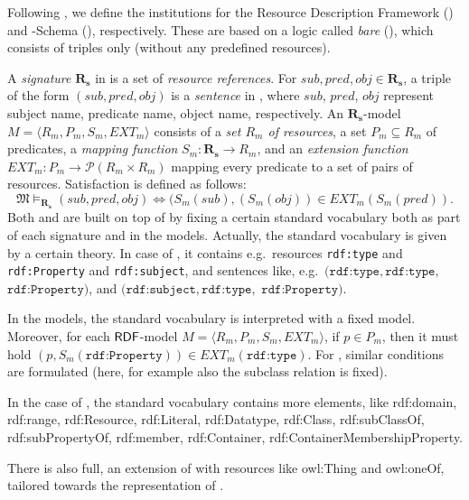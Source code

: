 \documentclass[10pt,%
\ifpretendfinal
final%
\else
draft%
\fi,
]{scrreprt}
\begin{document}
\begin{definition}
Following \cite{Lucanu}, 
we define the institutions for the Resource Description
Framework (\RDF) and \RDF-Schema (\RDFS), respectively. 
These are based on a logic called \emph{bare} \RDF (\SimpleRDF), which consists
of triples only (without any predefined resources).

A \textit{signature} $\mathbf{R_s}$ in \SimpleRDF is a set of
\textit{resource references}. For $sub, pred, obj \in \mathbf{R_s}$, a
triple of the form $(sub, pred, obj)$ is a \textit{sentence} in \SimpleRDF,
where $sub$, $pred$, $obj$ represent subject name, predicate name,
object name, respectively. An $\mathbf{R_s}$-model $M =
\langle R_m, P_m, S_m, EXT_m \rangle$ consists of a \textit{set $R_m$
  of resources}, a set $P_m \subseteq R_m$ of predicates, a
\textit{mapping function} $S_m:\mathbf{R_s} \rightarrow R_m$, and an
\textit{extension function} $EXT_m: P_m \rightarrow \mathcal{P}(R_m
\times R_m)$ mapping every predicate to a set of pairs of
resources. Satisfaction is defined as follows:
%
\[\mathfrak{M} \models_{\mathbf{R_s}} (sub, pred, obj) \Leftrightarrow (S_{m}(sub),
(S_{m}(obj)) \in EXT_{m} (S_m(pred)). \]
%
Both \RDF and \RDFS are built on top of \SimpleRDF by fixing a certain
standard vocabulary both as part of each signature and in the models.
Actually, the standard vocabulary is given by a certain theory. In case
of \RDF, it contains e.g.\ resources \texttt{rdf:type} and
\texttt{rdf:Property} and \texttt{rdf:subject}, and sentences like, e.g.\
$(\texttt{rdf:type},\texttt{rdf:type},$ $ \texttt{rdf:Property})$, and $(\texttt{rdf:subject}, \texttt{rdf:type},$  $\texttt{rdf:Property})$.

In the models, the standard vocabulary is interpreted with a fixed
model.  Moreover, for each $\mathsf{RDF}$-model $M = \langle R_m, P_m, S_m,
EXT_m \rangle$, if $p\in P_m$, then it must hold
$(p,S_m(\texttt{rdf:Property}))\in EXT_m(\texttt{rdf:type})$.
For \RDFS, similar conditions are formulated (here, for example also
the subclass relation is fixed).


In the case of \RDFS, the standard vocabulary contains more elements,
like
rdf:domain,
rdf:range, rdf:Resource, rdf:Literal, rdf:Datatype, rdf:Class,
rdf:subClassOf, rdf:subPropertyOf, rdf:member, rdf:Container,
rdf:ContainerMembershipProperty.

There is also \OWL full, an extension of \RDFS with resources
like owl:Thing and owl:oneOf, tailored towards the representation of
\OWL.

\end{definition}
\end{document}
